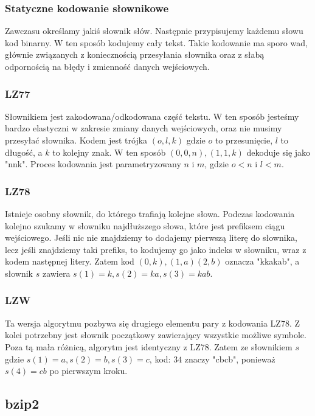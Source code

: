 \documentclass{../notatki}
\begin{document}
\subsubsection{Statyczne kodowanie słownikowe}

Zawczasu określamy jakiś słownik słów. Następnie przypisujemy każdemu słowu
kod binarny. W ten sposób kodujemy cały tekst. Takie kodowanie ma sporo wad,
głównie związanych z koniecznością przesyłania słownika oraz z słabą
odpornością na błędy i zmienność danych wejściowych.

\subsubsection{LZ77}

Słownikiem jest zakodowana/odkodowana część tekstu. W ten sposób jesteśmy bardzo
elastyczni w zakresie zmiany danych wejściowych, oraz nie musimy przesyłać
słownika. Kodem jest trójka $(o, l, k)$ gdzie $o$ to przesunięcie, $l$ to
długość, a $k$ to kolejny znak. W ten sposób $(0, 0, n),(1, 1, k)$ dekoduje się
jako "nnk". Proces kodowania jest parametryzowany $n$ i $m$, gdzie $o < n$ i
$l < m$.

\subsubsection{LZ78}

Istnieje osobny słownik, do którego trafiają kolejne słowa. Podczas kodowania
kolejno szukamy w słowniku najdłuższego słowa, które jest prefiksem ciągu
wejściowego. Jeśli nic nie znajdziemy to dodajemy pierwszą literę do słownika,
lecz jeśli znajdziemy taki prefiks, to kodujemy go jako indeks w słowniku,
wraz z kodem następnej litery. Zatem kod $(0,k),(1,a)(2,b)$ oznacza "kkakab",
a słownik $s$ zawiera $s(1)=k,s(2)=ka,s(3)=kab$.

\subsubsection{LZW}

Ta wersja algorytmu pozbywa się drugiego elementu pary z kodowania LZ78.
Z kolei potrzebny jest słownik początkowy zawierający wszystkie możliwe
symbole. Poza tą mała różnicą, algorytm jest identyczny z LZ78.
Zatem ze słownikiem $s$ gdzie $s(1)=a,s(2)=b,s(3)=c$, kod:
$34$ znaczy "cbcb", ponieważ $s(4)=cb$ po pierwszym kroku.

\subsection{bzip2}
\end{document}

